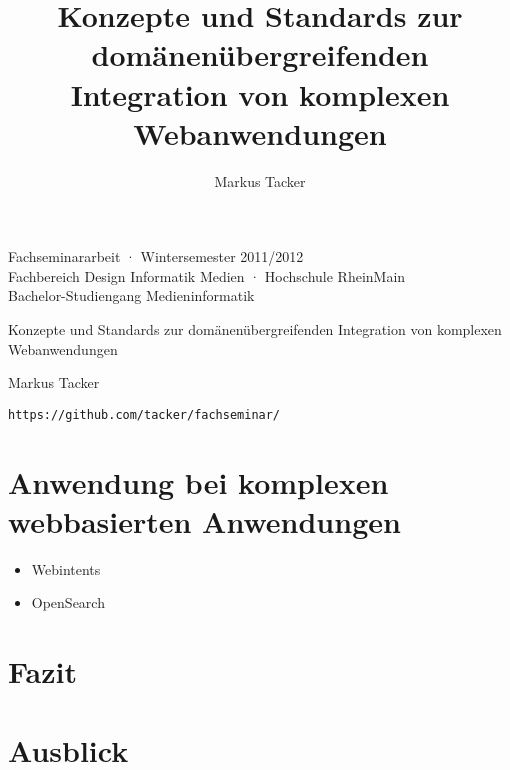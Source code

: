 \documentclass[10pt,a4paper]{article}
\begin{document}
\author{Markus Tacker}
\title{Konzepte und Standards zur domänenübergreifenden Integration von komplexen Webanwendungen}

\begin{center}

\begin{small}Fachseminararbeit · Wintersemester 2011/2012\\Fachbereich Design Informatik Medien · Hochschule RheinMain\\Bachelor-Studiengang Medieninformatik\end{small}

\bigskip

\begin{huge}Konzepte und Standards 
\medskip
zur domänenübergreifenden Integration
\medskip
von komplexen Webanwendungen\end{huge}

\bigskip

\begin{large}Markus Tacker\end{large}

\begin{small}\texttt{https://github.com/tacker/fachseminar/}\end{small}

\end{center}



\pagebreak

\tableofcontents







\section{Anwendung bei komplexen webbasierten Anwendungen}
\label{l:verwendung}


\begin{itemize}
\item Webintents
\item OpenSearch
\end{itemize}

\section{Fazit}
\label{l:fazit}
\section{Ausblick}
\label{l:ausblick}
\pagebreak


\end{document}
